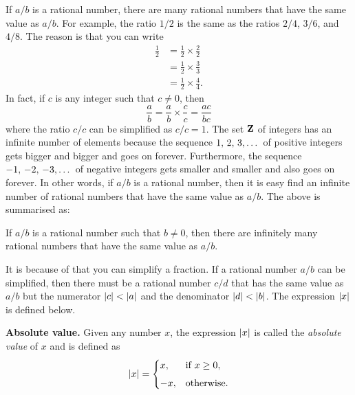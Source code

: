 \documentclass[a4paper,oneside,12pt]{article}
\begin{document}

If $a/b$ is a rational number, there are many rational numbers that
have the same value as $a/b$.  For example, the ratio $1/2$ is the
same as the ratios $2/4$, $3/6$, and $4/8$.  The reason is that you
can write
\begin{align*}
\frac{1}{2}
&=
\frac{1}{2} \times \frac{2}{2} \\[4pt]
&=
\frac{1}{2} \times \frac{3}{3} \\[4pt]
&=
\frac{1}{2} \times \frac{4}{4}.
\end{align*}
In fact, if $c$ is any integer such that $c \neq 0$, then
\[
\frac{a}{b}
=
\frac{a}{b} \times \frac{c}{c}
=
\frac{ac}{bc}
\]
where the ratio $c/c$ can be simplified as $c/c = 1$.  The set $\mathbf{Z}$
of integers has an infinite number of elements because the sequence
${1},\, {2},\, {3},\dots$ of positive integers gets bigger and bigger and goes
on forever.  Furthermore, the sequence ${-1},\, {-2},\, {-3},\dots$ of negative
integers gets smaller and smaller and also goes on forever.  In other
words, if $a/b$ is a rational number, then it is easy find an infinite
number of rational numbers that have the same value as $a/b$.  The
above is summarised as:

\begin{theorem}
\label{thm:infinitely_many_rationals_same_value}
If $a/b$ is a rational number such that $b \neq 0$, then there are
infinitely many rational numbers that have the same value as $a/b$.
\end{theorem}

It is because of 
that you can simplify a fraction.  If a rational number $a/b$ can be
simplified, then there must be a rational number $c/d$ that has the
same value as $a/b$ but the numerator
$\lvert c\rvert < \lvert a\rvert$ and the denominator
$\lvert d\rvert < \lvert b\rvert$.  The expression
$\lvert x\rvert$ is defined below.

\begin{definition}
\textbf{Absolute value.}
Given any number $x$, the expression $\lvert x\rvert$ is called the
\emph{absolute value} of $x$ and is defined as
\begin{equation}
\label{eqn:define_absolute_value}
\lvert x\rvert
=
\begin{cases}
x,  & \text{if $x \geq 0$}, \\[4pt]
-x, & \text{otherwise}.
\end{cases}
\end{equation}
\end{definition}
\end{document}
